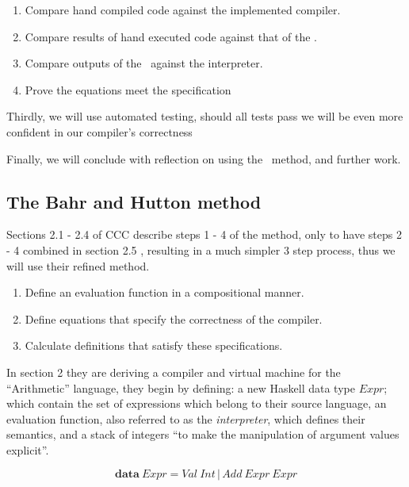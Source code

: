 \documentclass {article}
\begin{document}
\begin{enumerate}
	\item Compare hand compiled code against the
		implemented compiler.
	\item Compare results of hand executed code 
		against that of the \vm.
	\item Compare outputs of the \vm\ against the interpreter.
	\item Prove the equations meet the specification\cite[page 14]{bandh}
\end{enumerate}

Thirdly, we will use automated testing,
should all tests pass we will
be even more confident in our 
compiler's correctness

Finally, we will conclude with 
reflection on using the \BH\ method,
and further work.




\subsection{The Bahr and Hutton method}

Sections 2.1 - 2.4 of CCC describe steps
1 - 4 of the method, only to have steps 2 - 4 combined
in section 2.5 \cite[2.5 Combining the transformation steps]{bandh},
resulting in a much simpler 3 step process, 
thus we will use their refined method\cite[page 12]{bandh}.

\begin{enumerate}
	\item Define an evaluation function
		in a compositional manner.
	\item Define equations that specify
		the correctness of the compiler.
	\item Calculate definitions that 
		satisfy these specifications.
\end{enumerate}

In section 2 they are deriving a compiler
and virtual machine for the ``Arithmetic'' language,
they begin by defining: a new Haskell data type $Expr$;
which contain the set of expressions which belong to their source language,
an evaluation function, also referred to as the \emph{interpreter},
which defines their semantics,
and a stack of integers 
``to make the manipulation of argument values explicit''.

	\[ \textbf{data} \  Expr = Val \ Int \, | \, Add \ Expr \ Expr\]
\end{document}
